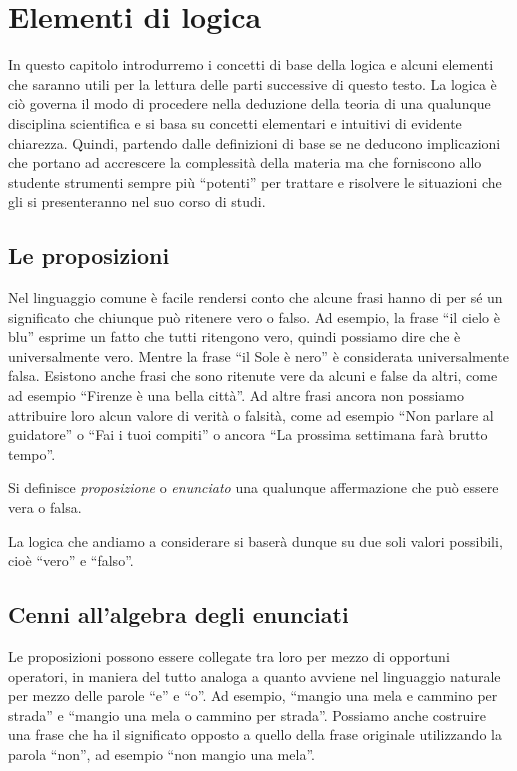 \chapter{Elementi di logica}

In questo capitolo introdurremo i concetti di base della logica e alcuni elementi che saranno utili per la lettura delle parti successive di questo testo.
La logica è ciò governa il modo di procedere nella deduzione della teoria di una qualunque disciplina scientifica e si basa su concetti elementari e intuitivi di evidente chiarezza. Quindi, partendo dalle definizioni di base se ne deducono implicazioni che portano ad accrescere la complessità della materia ma che forniscono allo studente strumenti sempre più ``potenti'' per trattare e risolvere le situazioni che gli si presenteranno nel suo corso di studi.

\section{Le proposizioni}

Nel linguaggio comune è facile rendersi conto che alcune frasi hanno di per sé un significato che chiunque può ritenere vero o falso. Ad esempio, la frase ``il cielo è blu'' esprime un fatto che tutti ritengono vero, quindi possiamo dire che è universalmente vero. Mentre la frase ``il Sole è nero'' è considerata universalmente falsa. Esistono anche frasi che sono ritenute vere da alcuni e false da altri, come ad esempio ``Firenze è una bella città''. Ad altre frasi ancora non possiamo attribuire loro alcun valore di verità o falsità, come ad esempio ``Non parlare al guidatore'' o ``Fai i tuoi compiti'' o ancora ``La prossima settimana farà brutto tempo''.

\begin{definizione}
Si definisce \emph{proposizione} o \emph{enunciato} una qualunque affermazione che può essere vera o falsa.
\end{definizione}

La logica che andiamo a considerare si baserà dunque su due soli valori possibili, cioè ``vero'' e ``falso''.

\section{Cenni all'algebra degli enunciati}

Le proposizioni possono essere collegate tra loro per mezzo di opportuni operatori, in maniera del tutto analoga a quanto avviene nel linguaggio naturale per mezzo delle parole ``e'' e ``o''. Ad esempio, ``mangio una mela e cammino per strada'' e ``mangio una mela o cammino per strada''. Possiamo anche costruire una frase che ha il significato opposto a quello della frase originale utilizzando la parola ``non'', ad esempio ``non mangio una mela''.

